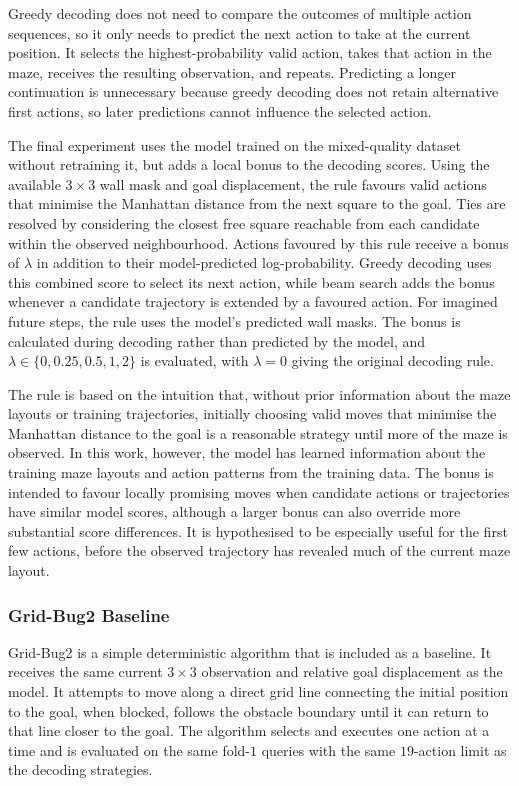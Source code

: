﻿\documentclass[12pt,a4paper]{article}
\theoremstyle{definition}
\begin{document}
Greedy decoding does not need to compare the outcomes of multiple action sequences,
so it only needs to predict the next action to take at the current position. It selects the
highest-probability valid action, takes that action in the maze, receives the resulting
observation, and repeats. Predicting a longer continuation is unnecessary because greedy
decoding does not retain alternative first actions, so later predictions cannot influence
the selected action.

The final experiment uses the model trained on the mixed-quality dataset without retraining it,
but adds a local bonus to the decoding scores. Using the available $3 \times 3$ wall mask and goal
displacement, the rule favours valid actions that minimise the Manhattan distance from the next
square to the goal. Ties are resolved by considering the closest free square reachable from each
candidate within the observed neighbourhood. Actions favoured by this rule receive a bonus of
$\lambda$ in addition to their model-predicted log-probability. Greedy decoding uses this combined
score to select its next action, while beam search adds the bonus whenever a candidate trajectory
is extended by a favoured action. For imagined future steps, the rule uses the model's predicted
wall masks. The bonus is calculated during decoding rather than predicted by the model, and
$\lambda\in\{0,0.25,0.5,1,2\}$ is evaluated, with $\lambda=0$ giving the original decoding rule.	

The rule is based on the intuition that, without prior information about the maze layouts or
training trajectories, initially choosing valid moves that minimise the Manhattan distance to
the goal is a reasonable strategy until more of the maze is observed. In this work, however,
the model has learned information about the training maze layouts and action patterns from the
training data. The bonus is intended to favour locally promising moves when candidate actions
or trajectories have similar model scores, although a larger bonus can also override more
substantial score differences. It is hypothesised to be especially useful for the first few
actions, before the observed trajectory has revealed much of the current maze layout.




\subsubsection{Grid-Bug2 Baseline}

Grid-Bug2 is a simple deterministic algorithm that is included as a baseline. It receives the same
current $3\times3$ observation and relative goal displacement as the model. It attempts
to move along a direct grid line connecting the initial position to the goal, when blocked, follows the obstacle
boundary until it can return to that line closer to the goal. The algorithm selects and
executes one action at a time and is evaluated on the same fold-$1$ queries with the same
$19$-action limit as the decoding strategies.
\end{document}
